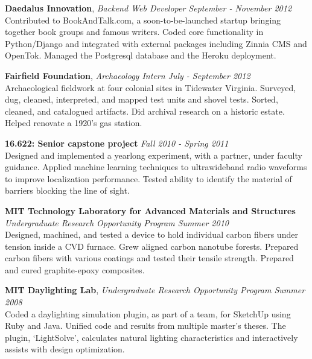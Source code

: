 \documentclass[margin]{res}
\begin{document}
\begin{resume}
 {\bf Daedalus Innovation}, \emph{Backend Web Developer \hfill September - November 2012} \\
 Contributed to BookAndTalk.com, a soon-to-be-launched startup bringing together book groups and famous writers. Coded core functionality in Python/Django and integrated with external packages including Zinnia CMS and OpenTok. Managed the Postgresql database and the Heroku deployment.

 {\bf Fairfield Foundation}, 
 \emph{Archaeology Intern \hfill July - September 2012}\\
Archaeological fieldwork at four colonial sites in Tidewater Virginia. Surveyed, dug, cleaned, interpreted, and mapped test units and shovel tests. Sorted, cleaned, and catalogued artifacts. Did archival research on a historic estate. Helped renovate a 1920's gas station.

 {\bf 16.622: Senior capstone project} \hfill \emph{Fall 2010 - Spring 2011} \\
Designed and implemented a yearlong experiment, with a partner, under faculty guidance. Applied machine learning techniques to ultrawideband radio waveforms to improve localization performance. Tested ability to identify the material of barriers blocking the line of sight. 

 {\bf MIT Technology Laboratory for Advanced Materials and Structures } \\
 \emph{Undergraduate Research Opportunity Program \hfill Summer 2010}\\
Designed, machined, and tested a device to hold individual carbon fibers under tension inside a CVD furnace. Grew aligned carbon nanotube forests. Prepared carbon fibers with various coatings and tested their tensile strength. Prepared and cured graphite-epoxy composites.

 {\bf MIT Daylighting Lab}, \emph{Undergraduate Research Opportunity Program \hfill Summer 2008}\\
Coded a daylighting simulation plugin, as part of a team, for SketchUp using Ruby and Java. Unified code and results from multiple master's theses. The plugin, `LightSolve', calculates natural lighting characteristics and interactively assists with design optimization.




\end{resume}
\end{document}
